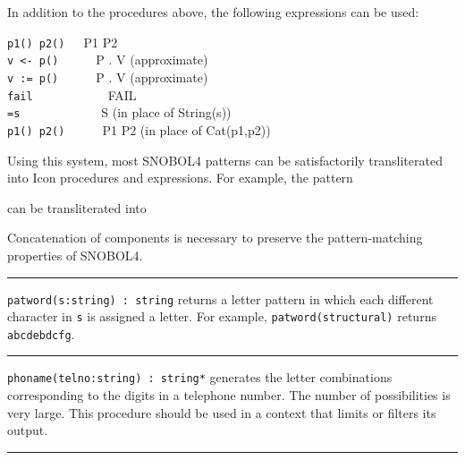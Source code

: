 In addition to the procedures above, the following expressions can be
used:

\texttt{p1() {\textbar} p2()}\ \ \ P1 {\textbar} P2\\
\texttt{v {\textless}- p()}\ \ \ \ \ \ P . V (approximate)\\
\texttt{v := p()}\ \ \ \ \ \ P . V (approximate)\\
\texttt{fail}\ \ \ \ \ \ \ \ \ \ \ \ FAIL\\
\texttt{=s}\ \ \ \ \ \ \ \ \ \ \ \ \ S (in place of String(s))\\
\texttt{p1() {\textbar}{\textbar} p2()}\ \ \ \ \ \ P1 P2 (in place of Cat(p1,p2))

Using this system, most SNOBOL4 patterns can be satisfactorily
transliterated into Icon procedures and expressions. For example, the
pattern


can be transliterated into


Concatenation of components is necessary to preserve the
pattern-matching properties of SNOBOL4. 

\vspace{0.25cm}\hrule{}

\texttt{patword(s:string) : string} returns a letter pattern in which
each different character in \texttt{s} is assigned a letter. For
example, \texttt{patword({\textquotedbl}structural{\textquotedbl})}
returns \texttt{{\textquotedbl}abcdebdcfg{\textquotedbl}}.

\vspace{0.25cm}\hrule{}

\texttt{phoname(telno:string) : string*} generates the letter
combinations corresponding to the digits in a telephone number. The
number of possibilities is very large. This procedure should be used in
a context that limits or filters its output.

\vspace{0.25cm}\hrule{}

